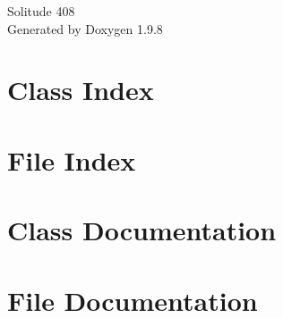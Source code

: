 \documentclass[twoside]{book}
\newcommand{\+}{\discretionary{\mbox{\scriptsize$\hookleftarrow$}}{}{}}
\newcommand{\clearemptydoublepage}{%
    \newpage{\pagestyle{empty}\cleardoublepage}%
  }
\begin{document}
  \raggedbottom
    \hypersetup{pageanchor=false,
                bookmarksnumbered=true,
                pdfencoding=unicode
               }
  \begin{titlepage}
  \vspace*{7cm}
  \begin{center}%
  {\Large Solitude 408}\\
  \vspace*{1cm}
  {\large Generated by Doxygen 1.9.8}\\
  \end{center}
  \end{titlepage}
  \clearemptydoublepage
  \tableofcontents
  \clearemptydoublepage
  \hypersetup{pageanchor=true}

\chapter{Class Index}

\chapter{File Index}

\chapter{Class Documentation}






\chapter{File Documentation}










































  \backmatter
  \newpage
  \clearemptydoublepage
  \printindex
\end{document}
